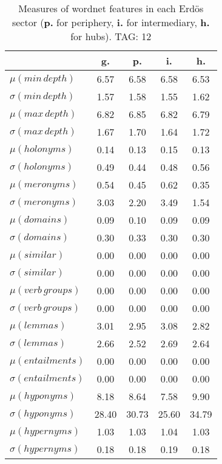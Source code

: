 \begin{table}[h!]
\begin{center}
\begin{tabular}{| l || c | c | c | c |}\hline
 & {\bf g.} & {\bf p.} & {\bf i.} & {\bf h.} \\\hline\hline
$\mu(min\,depth)$ & 6.57  & 6.58  & 6.58  & 6.53 \\
$\sigma(min\,depth)$ & 1.57  & 1.58  & 1.55  & 1.62 \\\hline
$\mu(max\,depth)$ & 6.82  & 6.85  & 6.82  & 6.79 \\
$\sigma(max\,depth)$ & 1.67  & 1.70  & 1.64  & 1.72 \\\hline
$\mu(holonyms)$ & 0.14  & 0.13  & 0.15  & 0.13 \\
$\sigma(holonyms)$ & 0.49  & 0.44  & 0.48  & 0.56 \\\hline
$\mu(meronyms)$ & 0.54  & 0.45  & 0.62  & 0.35 \\
$\sigma(meronyms)$ & 3.03  & 2.20  & 3.49  & 1.54 \\\hline
$\mu(domains)$ & 0.09  & 0.10  & 0.09  & 0.09 \\
$\sigma(domains)$ & 0.30  & 0.33  & 0.30  & 0.30 \\\hline
$\mu(similar)$ & 0.00  & 0.00  & 0.00  & 0.00 \\
$\sigma(similar)$ & 0.00  & 0.00  & 0.00  & 0.00 \\\hline
$\mu(verb\,groups)$ & 0.00  & 0.00  & 0.00  & 0.00 \\
$\sigma(verb\,groups)$ & 0.00  & 0.00  & 0.00  & 0.00 \\\hline
$\mu(lemmas)$ & 3.01  & 2.95  & 3.08  & 2.82 \\
$\sigma(lemmas)$ & 2.66  & 2.52  & 2.69  & 2.64 \\\hline
$\mu(entailments)$ & 0.00  & 0.00  & 0.00  & 0.00 \\
$\sigma(entailments)$ & 0.00  & 0.00  & 0.00  & 0.00 \\\hline
$\mu(hyponyms)$ & 8.18  & 8.64  & 7.58  & 9.90 \\
$\sigma(hyponyms)$ & 28.40  & 30.73  & 25.60  & 34.79 \\\hline
$\mu(hypernyms)$ & 1.03  & 1.03  & 1.04  & 1.03 \\
$\sigma(hypernyms)$ & 0.18  & 0.18  & 0.19  & 0.18 \\\hline
\end{tabular}
\caption{Measures of wordnet features in each Erd\"os sector ({{\bf p.}} for periphery, {{\bf i.}} for intermediary, {{\bf h.}} for hubs). TAG: 12}
\end{center}
\end{table}
